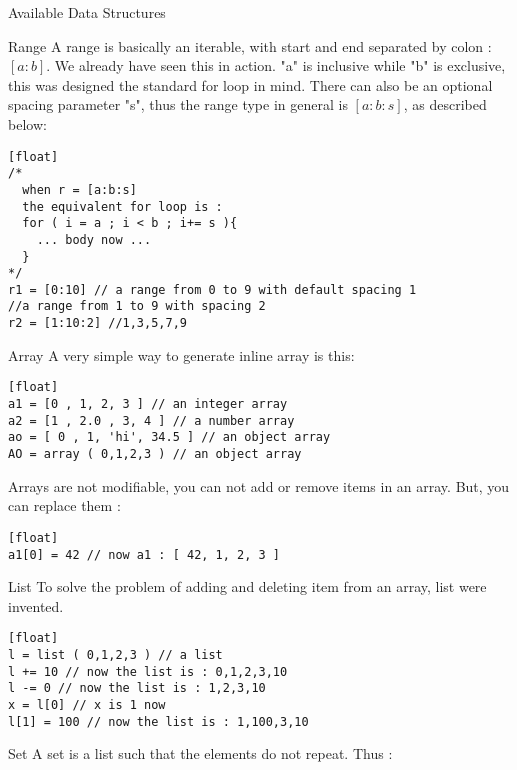 \begin{section}{Available Data Structures}

\begin{subsection}{Range}
A range is basically an iterable, with start and end separated by colon : $[a:b]$.
We already have seen this in action. "a" is inclusive while "b" is exclusive, 
this was designed the standard for loop in mind. There can also be an optional spacing parameter "s",
thus the range type in general is $[a:b:s]$, as described below:

\begin{lstlisting}[style=JexlStyle][float]
/* 
  when r = [a:b:s] 
  the equivalent for loop is :
  for ( i = a ; i < b ; i+= s ){
    ... body now ...  
  }
*/
r1 = [0:10] // a range from 0 to 9 with default spacing 1
//a range from 1 to 9 with spacing 2
r2 = [1:10:2] //1,3,5,7,9   
\end{lstlisting}
\end{subsection}

\begin{subsection}{Array}
A very simple way to generate inline array is this:

\begin{lstlisting}[style=JexlStyle][float]
a1 = [0 , 1, 2, 3 ] // an integer array 
a2 = [1 , 2.0 , 3, 4 ] // a number array 
ao = [ 0 , 1, 'hi', 34.5 ] // an object array   
AO = array ( 0,1,2,3 ) // an object array  
\end{lstlisting}
Arrays are not modifiable, you can not add or remove items in an array.
But, you can replace them :
\begin{lstlisting}[style=JexlStyle][float]
a1[0] = 42 // now a1 : [ 42, 1, 2, 3 ]
\end{lstlisting}
\end{subsection}

\begin{subsection}{List}
To solve the problem of adding and deleting item from an array, list were invented.
\begin{lstlisting}[style=JexlStyle][float]
l = list ( 0,1,2,3 ) // a list  
l += 10 // now the list is : 0,1,2,3,10
l -= 0 // now the list is : 1,2,3,10
x = l[0] // x is 1 now
l[1] = 100 // now the list is : 1,100,3,10 
\end{lstlisting}

\end{subsection}

\begin{subsection}{Set}
A set is a list such that the elements do not repeat.
Thus :


\end{subsection}
\end{section}
